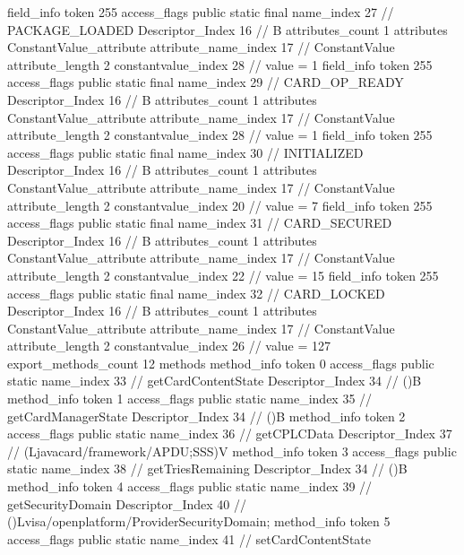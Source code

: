 {{{{{{{				}
				}
			}
			field_info {
				token	255
				access_flags	public static final
				name_index	27		// PACKAGE_LOADED
				Descriptor_Index	16		// B
				attributes_count	1
				attributes {
				ConstantValue_attribute {
					attribute_name_index	17		// ConstantValue
					attribute_length	2
					constantvalue_index	28		// value = 1
				}
				}
			}
			field_info {
				token	255
				access_flags	public static final
				name_index	29		// CARD_OP_READY
				Descriptor_Index	16		// B
				attributes_count	1
				attributes {
				ConstantValue_attribute {
					attribute_name_index	17		// ConstantValue
					attribute_length	2
					constantvalue_index	28		// value = 1
				}
				}
			}
			field_info {
				token	255
				access_flags	public static final
				name_index	30		// INITIALIZED
				Descriptor_Index	16		// B
				attributes_count	1
				attributes {
				ConstantValue_attribute {
					attribute_name_index	17		// ConstantValue
					attribute_length	2
					constantvalue_index	20		// value = 7
				}
				}
			}
			field_info {
				token	255
				access_flags	public static final
				name_index	31		// CARD_SECURED
				Descriptor_Index	16		// B
				attributes_count	1
				attributes {
				ConstantValue_attribute {
					attribute_name_index	17		// ConstantValue
					attribute_length	2
					constantvalue_index	22		// value = 15
				}
				}
			}
			field_info {
				token	255
				access_flags	public static final
				name_index	32		// CARD_LOCKED
				Descriptor_Index	16		// B
				attributes_count	1
				attributes {
				ConstantValue_attribute {
					attribute_name_index	17		// ConstantValue
					attribute_length	2
					constantvalue_index	26		// value = 127
				}
				}
			}
			}
			export_methods_count	12
			methods {
				method_info {
					token	0
					access_flags	public static
					name_index	33		// getCardContentState
					Descriptor_Index	34		// ()B
				}
				method_info {
					token	1
					access_flags	public static
					name_index	35		// getCardManagerState
					Descriptor_Index	34		// ()B
				}
				method_info {
					token	2
					access_flags	public static
					name_index	36		// getCPLCData
					Descriptor_Index	37		// (Ljavacard/framework/APDU;SSS)V
				}
				method_info {
					token	3
					access_flags	public static
					name_index	38		// getTriesRemaining
					Descriptor_Index	34		// ()B
				}
				method_info {
					token	4
					access_flags	public static
					name_index	39		// getSecurityDomain
					Descriptor_Index	40		// ()Lvisa/openplatform/ProviderSecurityDomain;
				}
				method_info {
					token	5
					access_flags	public static
					name_index	41		// setCardContentState
}}}}}
